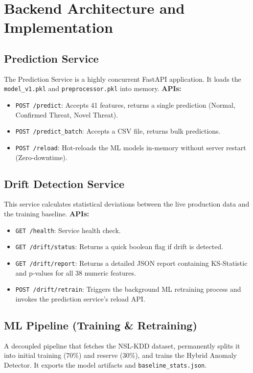 \documentclass[12pt]{article}
\begin{document}
\section{Backend Architecture and Implementation}

\subsection{Prediction Service}
The Prediction Service is a highly concurrent FastAPI application. It loads the \texttt{model\_v1.pkl} and \texttt{preprocessor.pkl} into memory.
\textbf{APIs:}
\begin{itemize}
    \item \texttt{POST /predict}: Accepts 41 features, returns a single prediction (Normal, Confirmed Threat, Novel Threat).
    \item \texttt{POST /predict\_batch}: Accepts a CSV file, returns bulk predictions.
    \item \texttt{POST /reload}: Hot-reloads the ML models in-memory without server restart (Zero-downtime).
\end{itemize}

\subsection{Drift Detection Service}
This service calculates statistical deviations between the live production data and the training baseline.
\textbf{APIs:}
\begin{itemize}
    \item \texttt{GET /health}: Service health check.
    \item \texttt{GET /drift/status}: Returns a quick boolean flag if drift is detected.
    \item \texttt{GET /drift/report}: Returns a detailed JSON report containing KS-Statistic and p-values for all 38 numeric features.
    \item \texttt{POST /drift/retrain}: Triggers the background ML retraining process and invokes the prediction service's reload API.
\end{itemize}

\subsection{ML Pipeline (Training \& Retraining)}
A decoupled pipeline that fetches the NSL-KDD dataset, permanently splits it into initial training (70\%) and reserve (30\%), and trains the Hybrid Anomaly Detector. It exports the model artifacts and \texttt{baseline\_stats.json}.
\end{document}
